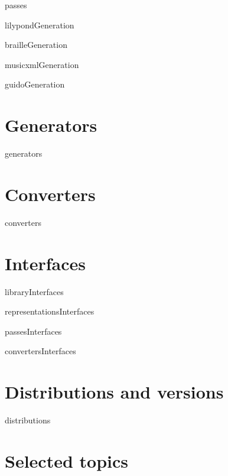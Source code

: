 \documentclass[11pt,a4paper]{report}
\begin{document}
{passes}

{lilypondGeneration}

{brailleGeneration}

{musicxmlGeneration}

{guidoGeneration}


\part{Generators}

{generators}


\part{Converters}

{converters}


\part{Interfaces}

{libraryInterfaces}

{representationsInterfaces}

{passesInterfaces}

{convertersInterfaces}


\part{Distributions and versions}

{distributions}


\part{Selected topics}
\end{document}
